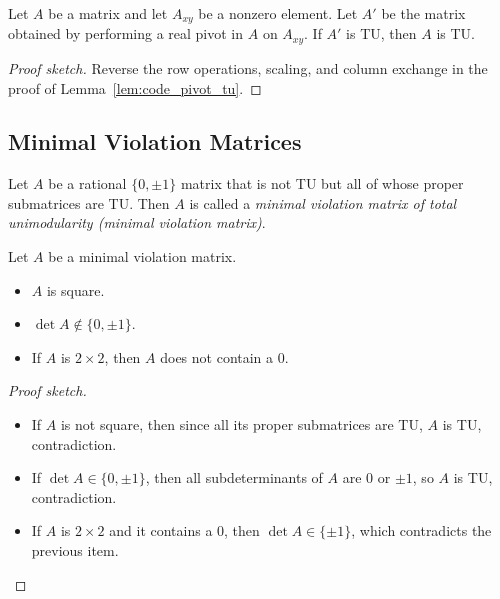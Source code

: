 \begin{lemma}
  \label{lem:code_reverse_pivot_tu}
  Let $A$ be a matrix and let $A_{xy}$ be a nonzero element.
  Let $A'$ be the matrix obtained by performing a real pivot in $A$ on $A_{xy}$.
  If $A'$ is TU, then $A$ is TU.
\end{lemma}

\begin{proof}[Proof sketch]
  Reverse the row operations, scaling, and column exchange in the proof of Lemma~\ref{lem:code_pivot_tu}.
\end{proof}


\subsection{Minimal Violation Matrices}

\begin{definition}
  \label{def:code_mvm}
  Let $A$ be a rational $\{0, \pm 1\}$ matrix that is not TU but all of whose proper submatrices are TU.
  Then $A$ is called a \emph{minimal violation matrix of total unimodularity (minimal violation matrix)}.
\end{definition}

\begin{lemma}
  \label{lem:code_mvm_props}
  Let $A$ be a minimal violation matrix.
  \begin{itemize}
    \item $A$ is square.
    \item $\det A \notin \{0, \pm 1\}$.
    \item If $A$ is $2 \times 2$, then $A$ does not contain a $0$.
  \end{itemize}
\end{lemma}

\begin{proof}[Proof sketch]
  \begin{itemize}
    \item If $A$ is not square, then since all its proper submatrices are TU, $A$ is TU, contradiction.
    \item If $\det A \in \{0, \pm 1\}$, then all subdeterminants of $A$ are $0$ or $\pm 1$, so $A$ is TU, contradiction.
    \item If $A$ is $2 \times 2$ and it contains a $0$, then $\det A \in \{\pm 1\}$, which contradicts the previous item.
  \end{itemize}
\end{proof}

